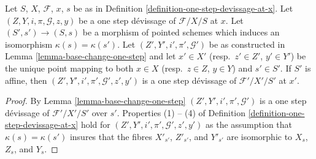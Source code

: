 \begin{lemma}
\label{lemma-base-change-one-step-at-x}
Let $S$, $X$, $\mathcal{F}$, $x$, $s$ be as in
Definition \ref{definition-one-step-devissage-at-x}.
Let $(Z, Y, i, \pi, \mathcal{G}, z, y)$ be a one step d\'evissage
of $\mathcal{F}/X/S$ at $x$.
Let $(S', s') \to (S, s)$ be a morphism of pointed schemes
which induces an isomorphism $\kappa(s) = \kappa(s')$.
Let $(Z', Y', i', \pi', \mathcal{G}')$ be as constructed in
Lemma \ref{lemma-base-change-one-step}
and let $x' \in X'$ (resp.\ $z' \in Z'$, $y' \in Y'$) be the
unique point mapping to both $x \in X$ (resp.\ $z \in Z$, $y \in Y$)
and $s' \in S'$.
If $S'$ is affine, then $(Z', Y', i', \pi', \mathcal{G}', z', y')$
is a one step d\'evissage of $\mathcal{F}'/X'/S'$ at $x'$.
\end{lemma}

\begin{proof}
By
Lemma \ref{lemma-base-change-one-step}
$(Z', Y', i', \pi', \mathcal{G}')$ is a one step d\'evissage of
$\mathcal{F}'/X'/S'$ over $s'$. Properties (1) -- (4) of
Definition \ref{definition-one-step-devissage-at-x}
hold for $(Z', Y', i', \pi', \mathcal{G}', z', y')$
as the assumption that $\kappa(s) = \kappa(s')$ insures that the fibres
$X'_{s'}$, $Z'_{s'}$, and $Y'_{s'}$ are isomorphic to
$X_s$, $Z_s$, and $Y_s$.
\end{proof}
